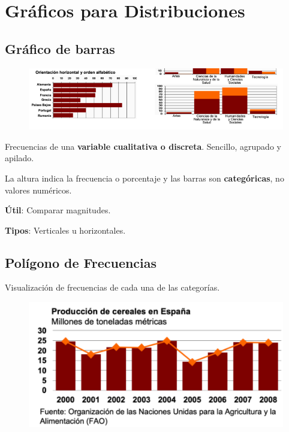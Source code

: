 \documentclass[12pt]{report} %
\begin{document}
\section{Gráficos para
Distribuciones}

\subsection{Gráfico de barras}

\begin{figure}[H]
	{\includegraphics[scale=.5]{Untitled 5.png}}
\end{figure}

Frecuencias de una \textbf{variable cualitativa o discreta}. Sencillo,
agrupado y apilado.

La altura indica la frecuencia o porcentaje y las barras son
\textbf{categóricas}, no valores numéricos.

\textbf{Útil}: Comparar magnitudes.

\textbf{Tipos}: Verticales u horizontales.

\subsection{Polígono de
Frecuencias}

Visualización de frecuencias de cada una de las categorías.
\begin{figure}[H]
	{\includegraphics[scale=.5]{Untitled 6.png}}
\end{figure}
\end{document}
